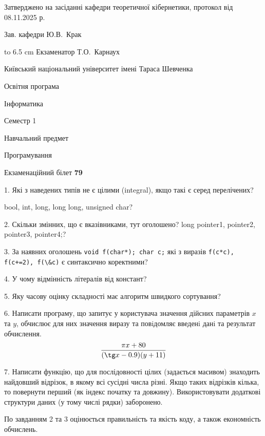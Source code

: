 \documentclass[12pt, ukrainian]{article}
\def\code#1{\Verb!#1!}
\begin{document}
{\smallskip\smallskip \begin {scriptsize} Затверджено на засіданні кафедри теоретичної кібернетики, протокол   від   08.11.2025 р.\par\smallskip\smallskip\smallskip\smallskip
{\parbox {6.5 cm} {Зав. кафедри \dotfill Ю.В.~Крак}}\hspace {0.7cm} {\hbox to 6.5 cm { Екзаменатор \dotfill Т.О.~Карнаух}} \end{scriptsize}}
\newpage
{{\begin {scriptsize}\par
{ \center  Київський національний університет імені Тараса Шевченка \par}
{\parbox {5 cm}{Освітня програма \hfill}{\parbox {7 cm}{Інформатика\hfill}}\parbox {6 cm}{\hfill Семестр 1}}\par
{\parbox {5 cm} {Навчальний предмет \hfill}\parbox {7 cm}{Програмування \hfill}\parbox {6cm}{\hfill}\par}\vspace{-15pt} \end{scriptsize}}{\center Екзаменаційний білет \No \textbf { 79 }\par}}
{%
1. Які з наведених типів не є цілими (integral), якщо такі є серед перелічених?

bool, int, long, long long, unsigned char?
\par
\vspace{2mm}
2. Скільки змінних, що є вказівниками, тут оголошено?
long pointer1, pointer2, pointer3, pointer4;?
\par
\vspace{2mm}
3. За наявних оголошень \code{void f(char*); char c;} які з виразів \code{f(c*c), f(c+=2), f(\&c)} є синтаксично коректними?
\par
\vspace{2mm}
4. У чому відмінність літералів від констант?
\par
\vspace{2mm}
5. Яку часову оцінку складності має алгоритм швидкого сортування?
\par
\vspace{2mm}
6. Написати програму, що запитує у користувача значення дійсних параметрів $x$ та $y$, обчислює для них значення виразу та повiдомляє введенi данi та результат обчислення.
$$\frac{\pi x + 80}{(\tg x - 0.9) (y + 11)}$$ 

\par
7. Написати функцію, що для послідовності цілих (задається масивом) знаходить найдовший відрізок, в якому всі сусідні числа різні. Якщо таких відрізків кілька, то повернути перший (як індекс початку та довжину). Використовувати додаткові структури даних (у тому числі рядки) заборонено.

По завданням 2 та 3 оцінюється правильність та якість коду, а також економність обчислень.

}
\end{document}
